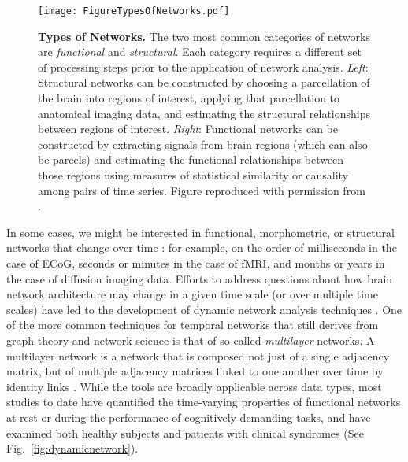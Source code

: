 \documentclass[12pt]{article}
\begin{document}
 \begin{figure}[ht!]
 	\centerline{\texttt{[image: FigureTypesOfNetworks.pdf]}}
 	\caption{\textbf{Types of Networks.} The two most common categories of networks are \emph{functional} and \emph{structural}. Each category requires a different set of processing steps prior to the application of network analysis. \emph{Left}: Structural networks can be constructed by choosing a parcellation of the brain into regions of interest, applying that parcellation to anatomical imaging data, and estimating the structural relationships between regions of interest. \emph{Right}: Functional networks can be constructed by extracting signals from brain regions (which can also be parcels) and estimating the functional relationships between those regions using measures of statistical similarity or causality among pairs of time series. Figure reproduced with permission from \cite{Bullmore2009}.}\label{fig:networktypes}
 	\centering
 \end{figure}

 \newpage

In some cases, we might be interested in functional, morphometric, or structural networks that change over time \cite{calhoun2014chronnectome}: for example, on the order of milliseconds in the case of ECoG, seconds or minutes in the case of fMRI, and months or years in the case of diffusion imaging data. Efforts to address questions about how brain network architecture may change in a given time scale (or over multiple time scales) have led to the development of dynamic network analysis techniques \cite{bassett2011dynamic,doron2012dynamic}. One of the more common techniques for temporal networks that still derives from graph theory and network science is that of so-called \emph{multilayer} networks. A multilayer network is a network that is composed not just of a single adjacency matrix, but of multiple adjacency matrices linked to one another over time by identity links \cite{bassett2013robust}. While the tools are broadly applicable across data types, most studies to date have quantified the time-varying properties of functional networks at rest or during the performance of cognitively demanding tasks, and have examined both healthy subjects and patients with clinical syndromes \cite{braun2015human} (See Fig.~\ref{fig:dynamicnetwork}). 
 
\end{document}
